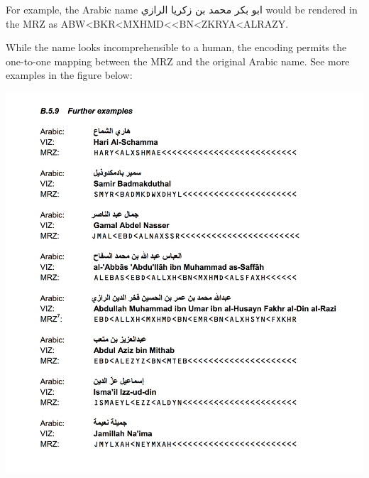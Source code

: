 For example, the Arabic name {\arfont ابو بكر محمد بن زكريا الرازي} would be
rendered in the MRZ as ABW<BKR<MXHMD<<BN<ZKRYA<ALRAZY.

While the name looks incomprehensible to a human, the encoding permits the
one-to-one mapping between the MRZ and the original Arabic name. See more
examples in the figure below:

\includegraphics{subtex/9309.3-appendix-b.5.9.png}
